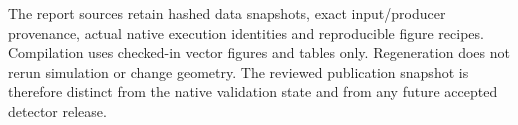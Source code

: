 The report sources retain hashed data snapshots, exact input/producer
provenance, actual native execution identities and reproducible figure recipes.
Compilation uses checked-in vector figures and tables only. Regeneration does
not rerun simulation or change geometry. The reviewed publication snapshot is
therefore distinct from the native validation state and from any future
accepted detector release.
